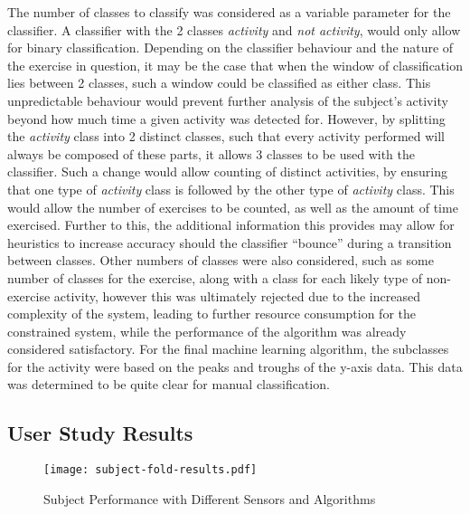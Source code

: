 The number of classes to classify was considered as a variable parameter for the classifier. A classifier with the 2 classes \textit{activity} and \textit{not activity}, would only allow for binary classification. Depending on the classifier behaviour and the nature of the exercise in question, it may be the case that when the window of classification lies between 2 classes, such a window could be classified as either class. This unpredictable behaviour would prevent further analysis of the subject's activity beyond how much time a given activity was detected for. However, by splitting the \textit{activity} class into 2 distinct classes, such that every activity performed will always be composed of these parts, it allows 3 classes to be used with the classifier. Such a change would allow counting of distinct activities, by ensuring that one type of \textit{activity} class is followed by the other type of \textit{activity} class. This would allow the number of exercises to be counted, as well as the amount of time exercised. Further to this, the additional information this provides may allow for heuristics to increase accuracy should the classifier ``bounce'' during a transition between classes. Other numbers of classes were also considered, such as some number of classes for the exercise, along with a class for each likely type of non-exercise activity, however this was ultimately rejected due to the increased complexity of the system, leading to further resource consumption for the constrained system, while the performance of the algorithm was already considered satisfactory. For the final machine learning algorithm, the subclasses for the activity were based on the peaks and troughs of the y-axis data. This data was determined to be quite clear for manual classification.

\subsection{User Study Results}

\begin{figure}
	\texttt{[image: subject-fold-results.pdf]}
	\caption{Subject Performance with Different Sensors and Algorithms \label{fig:subfold}}
\end{figure}

